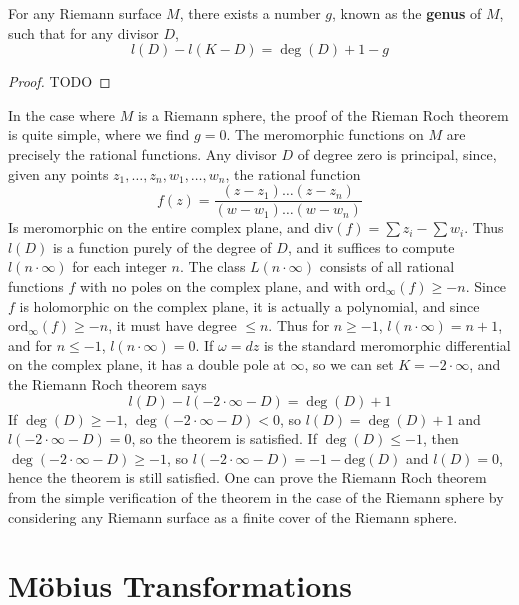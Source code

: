 \begin{theorem}
    For any Riemann surface $M$, there exists a number $g$, known as the {\bf genus} of $M$, such that for any divisor $D$,
    \[ l(D) - l(K-D) = \deg(D) + 1 - g \]
\end{theorem}
\begin{proof}
    TODO
\end{proof}

In the case where $M$ is a Riemann sphere, the proof of the Rieman Roch theorem is quite simple, where we find $g = 0$. The meromorphic functions on $M$ are precisely the rational functions. Any divisor $D$ of degree zero is principal, since, given any points $z_1, \dots, z_n, w_1, \dots, w_n$, the rational function
%
\[ f(z) = \frac{(z - z_1) \dots (z - z_n)}{(w - w_1) \dots (w - w_n)} \]
%
Is meromorphic on the entire complex plane, and $\text{div}(f) = \sum z_i - \sum w_i$. Thus $l(D)$ is a function purely of the degree of $D$, and it suffices to compute $l(n \cdot \infty)$ for each integer $n$. The class $L(n \cdot \infty)$ consists of all rational functions $f$ with no poles on the complex plane, and with $\text{ord}_\infty(f) \geq -n$. Since $f$ is holomorphic on the complex plane, it is actually a polynomial, and since $\text{ord}_\infty(f) \geq -n$, it must have degree $\leq n$. Thus for $n \geq -1$, $l(n \cdot \infty) = n+1$, and for $n \leq -1$, $l(n \cdot \infty) = 0$. If $\omega = dz$ is the standard meromorphic differential on the complex plane, it has a double pole at $\infty$, so we can set $K = - 2 \cdot \infty$, and the Riemann Roch theorem says
%
\[ l(D) - l(-2 \cdot \infty - D) = \deg(D) + 1 \]
%
If $\deg(D) \geq -1$, $\deg(-2 \cdot \infty - D) < 0$, so $l(D) = \deg(D) + 1$ and $l(-2 \cdot \infty - D) = 0$, so the theorem is satisfied. If $\deg(D) \leq -1$, then $\deg(-2 \cdot \infty - D) \geq -1$, so $l(-2 \cdot \infty - D) = -1-\text{deg}(D)$ and $l(D) = 0$, hence the theorem is still satisfied. One can prove the Riemann Roch theorem from the simple verification of the theorem in the case of the Riemann sphere by considering any Riemann surface as a finite cover of the Riemann sphere.

\section{M\"{o}bius Transformations}

